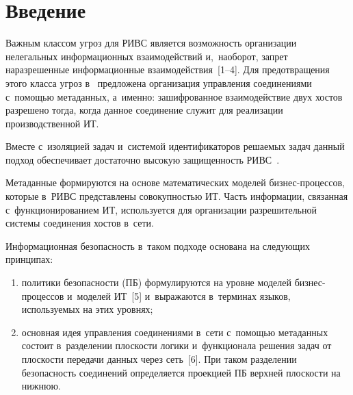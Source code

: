   



\thispagestyle{headings}

\begin{multicols}{2}

\label{st\stat}

\section{Введение }

  Важным классом угроз для \mbox{РИВС} 
  является воз\-мож\-ность организации нелегальных инфор\-мационных 
взаимодействий и,~на\-обо\-рот, запрет на\linebreak разрешенные информационные 
взаимодейст\-вия~[1--4]. Для пред\-от\-вра\-ще\-ния этого класса угроз  
в~\cite{1-gr, 2-gr, 3-gr} предложена организация управ\-ле\-ния со\-еди\-не\-ни\-ями 
с~по\-мощью метаданных, а~именно: за\-шиф\-ро\-ван\-ное взаимодействие двух хос\-тов 
разрешено тогда, когда данное со\-еди\-не\-ние служит для реализации 
производственной ИТ. 
  
  Вместе с~изоляцией задач и~сис\-те\-мой иденти\-фикаторов ре\-ша\-емых задач данный 
подход обеспечивает достаточно высокую за\-щи\-щен\-ность \mbox{РИВС}~\cite{1-gr, 2-gr}.
  
  Метаданные формируются на основе математических моделей  
биз\-нес-про\-цес\-сов, которые в~РИВС пред\-став\-ле\-ны со\-во\-куп\-ностью ИТ. Часть 
информации, связанная с~функционированием ИТ, используется для организации 
разрешительной сис\-те\-мы со\-еди\-не\-ния хос\-тов в~сети.
  
  Информационная безопасность в~таком подходе основана на сле\-ду\-ющих 
принципах: 
  \begin{enumerate}[(1)]
\item политики без\-опас\-ности (ПБ) формулируются на уровне моделей 
биз\-нес-про\-цес\-сов и~моделей ИТ~[5] 
и~выражаются в~терминах языков, ис\-поль\-зу\-емых на 
этих уровнях; 
\item основная идея управ\-ле\-ния со\-еди\-не\-ни\-ями в~сети с~по\-мощью 
метаданных со\-сто\-ит в~разделении плос\-кости логики и~функционала 
решения задач от плос\-кости передачи данных через сеть~[6]. При таком разделении 
без\-опас\-ность со\-еди\-не\-ний определяется проекцией ПБ 
верх\-ней плос\-кости на нижнюю. 
\end{enumerate}


\end{multicols}
